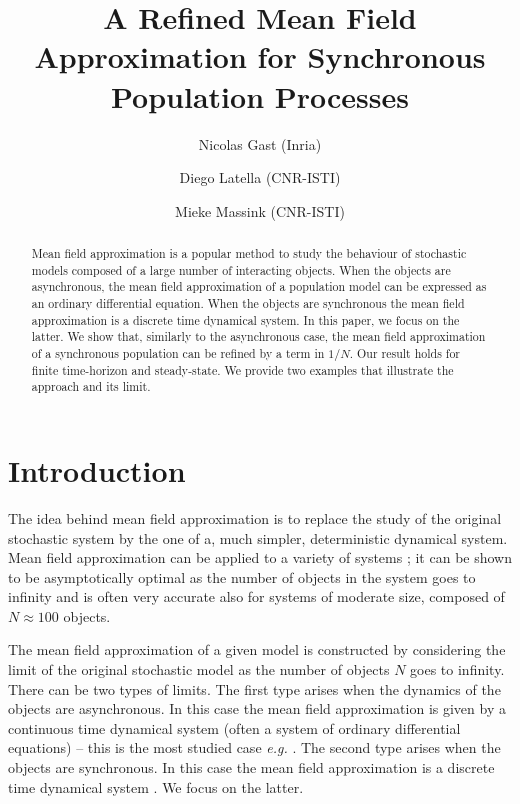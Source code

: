 \documentclass{sig-alternate-per}
\begin{document}
\title{A Refined Mean Field Approximation for Synchronous Population
  Processes}%

\author{Nicolas Gast (Inria) \and Diego Latella (CNR-ISTI) \and Mieke
  Massink (CNR-ISTI)}

\maketitle

\begin{abstract}
  Mean field approximation is a popular method to study the behaviour
  of stochastic models composed of a large number of interacting
  objects. When the objects are asynchronous, the mean field
  approximation of a population model can be expressed as an ordinary
  differential equation. When the objects are synchronous the mean
  field approximation is a discrete time dynamical system.  In this
  paper, we focus on the latter. We show that, similarly to the
  asynchronous case, the mean field approximation of a synchronous
  population can be refined by a term in $1/N$. Our result holds for
  finite time-horizon and steady-state. We provide two examples that
  illustrate the approach and its limit.
\end{abstract}



\section{Introduction}

The idea behind mean field approximation is to replace the study of
the original stochastic system by the one of a, much simpler,
deterministic dynamical system.  Mean field approximation can be
applied to a variety of systems \cite{vvedenskaya1996queueing}; it can
be shown to be asymptotically optimal as the number of objects in the
system goes to infinity \cite{kurtz70,Le+07,benaim2008class} and is
often very accurate also for systems of moderate size, composed of
$N\approx100$ objects.

The mean field approximation of a given model is constructed by
considering the limit of the original stochastic model as the number
of objects $N$ goes to infinity. There can be two types of limits. The
first type arises when the dynamics of the objects are
asynchronous. In this case the mean field approximation is given by a
continuous time dynamical system (often a system of ordinary
differential equations) -- this is the most studied case \emph{e.g.}
\cite{kurtz70,benaim2008class,BHLM13}.  The second type arises when
the objects are synchronous. In this case the mean field approximation
is a discrete time dynamical system \cite{Le+07,gastgaujalDEDS}.  We
focus on the latter.
\end{document}
